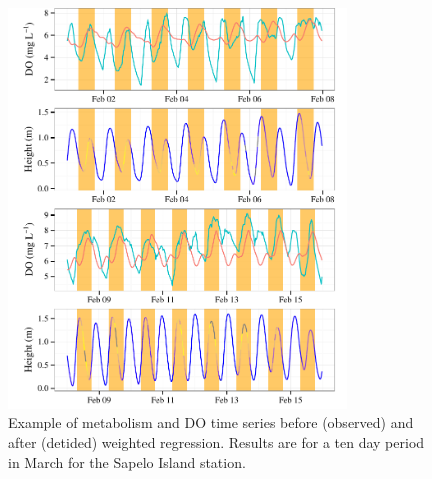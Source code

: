 \documentclass[letterpaper,12pt,oneside]{article}\usepackage[]{graphicx}\usepackage[]{color}
\newenvironment{knitrout}{}{} %
\begin{document}
\centering\vspace*{\fill}
\begin{knitrout}
\color{fgcolor}\begin{figure}[!ht]


{\centering \includegraphics[width=0.8\textwidth]{figure/case_ex1} 

}

\caption[Example of metabolism and \ac{DO} time series before (observed) and after (detided) weighted regression]{Example of metabolism and \ac{DO} time series before (observed) and after (detided) weighted regression. Results are for a ten day period in March for the Sapelo Island station.\label{fig:case_ex1}}
\end{figure}


\end{knitrout}
\vfill
\clearpage
\end{document}
